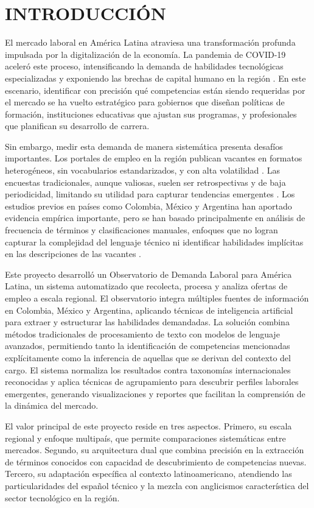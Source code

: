 \chapter{INTRODUCCIÓN}

El mercado laboral en América Latina atraviesa una transformación profunda impulsada por la digitalización de la economía. La pandemia de COVID-19 aceleró este proceso, intensificando la demanda de habilidades tecnológicas especializadas y exponiendo las brechas de capital humano en la región \cite{azuara2022}. En este escenario, identificar con precisión qué competencias están siendo requeridas por el mercado se ha vuelto estratégico para gobiernos que diseñan políticas de formación, instituciones educativas que ajustan sus programas, y profesionales que planifican su desarrollo de carrera.

Sin embargo, medir esta demanda de manera sistemática presenta desafíos importantes. Los portales de empleo en la región publican vacantes en formatos heterogéneos, sin vocabularios estandarizados, y con alta volatilidad \cite{echeverria2022}. Las encuestas tradicionales, aunque valiosas, suelen ser retrospectivas y de baja periodicidad, limitando su utilidad para capturar tendencias emergentes \cite{rubio2025}. Los estudios previos en países como Colombia, México y Argentina han aportado evidencia empírica importante, pero se han basado principalmente en análisis de frecuencia de términos y clasificaciones manuales, enfoques que no logran capturar la complejidad del lenguaje técnico ni identificar habilidades implícitas en las descripciones de las vacantes \cite{aguilera2018, martinez2024}.

Este proyecto desarrolló un Observatorio de Demanda Laboral para América Latina, un sistema automatizado que recolecta, procesa y analiza ofertas de empleo a escala regional. El observatorio integra múltiples fuentes de información en Colombia, México y Argentina, aplicando técnicas de inteligencia artificial para extraer y estructurar las habilidades demandadas. La solución combina métodos tradicionales de procesamiento de texto con modelos de lenguaje avanzados, permitiendo tanto la identificación de competencias mencionadas explícitamente como la inferencia de aquellas que se derivan del contexto del cargo. El sistema normaliza los resultados contra taxonomías internacionales reconocidas y aplica técnicas de agrupamiento para descubrir perfiles laborales emergentes, generando visualizaciones y reportes que facilitan la comprensión de la dinámica del mercado.

El valor principal de este proyecto reside en tres aspectos. Primero, su escala regional y enfoque multipaís, que permite comparaciones sistemáticas entre mercados. Segundo, su arquitectura dual que combina precisión en la extracción de términos conocidos con capacidad de descubrimiento de competencias nuevas. Tercero, su adaptación específica al contexto latinoamericano, atendiendo las particularidades del español técnico y la mezcla con anglicismos característica del sector tecnológico en la región.
